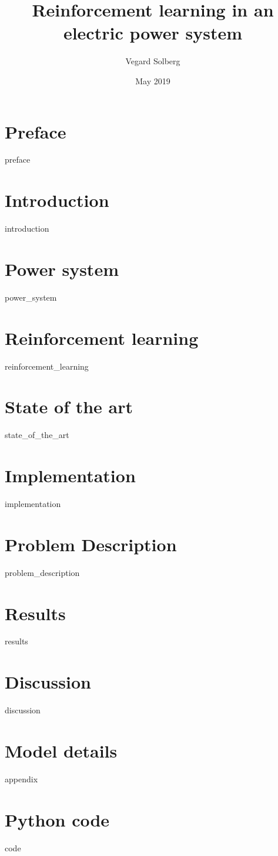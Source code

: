 \documentclass{book}
\title{Reinforcement learning in an electric power system}
\author{Vegard Solberg}
\date{May 2019}
\begin{document}
 
    \maketitle
    \frontmatter
    \chapter{Preface}
    {preface}
    
    \tableofcontents
    
    \mainmatter
    \chapter{Introduction}
    {introduction}
    
    \chapter{Power system}
    {power_system}
 
    \chapter{Reinforcement learning}
    {reinforcement_learning}
    
    \chapter{State of the art}
    {state_of_the_art}
    
    \chapter{Implementation}
    {implementation}
    
    \chapter{Problem Description}
    {problem_description}
    
    
    \chapter{Results}
    {results}
    
    \chapter{Discussion}
    {discussion}
    
    
    \appendix
    \chapter{Model details}
    {appendix}
    
    \chapter{Python code}
    {code}
    
    \printbibliography
\end{document}
